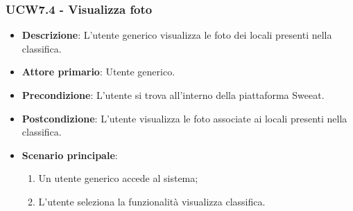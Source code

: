 \subsubsection{UCW7.4 - Visualizza foto}
\begin{itemize}
	\item \textbf{Descrizione}: L'utente generico visualizza le foto dei locali presenti nella classifica.
    \item \textbf{Attore primario}: Utente generico.
    \item \textbf{Precondizione}: L’utente si trova all’interno della piattaforma Sweeat.
    \item \textbf{Postcondizione}: L’utente visualizza le foto associate ai locali presenti nella classifica.
    \item \textbf{Scenario principale}: 
    \begin{enumerate}
        \item Un utente generico accede al sistema;
        \item L’utente seleziona la funzionalità visualizza classifica.
    \end{enumerate}
\end{itemize}
